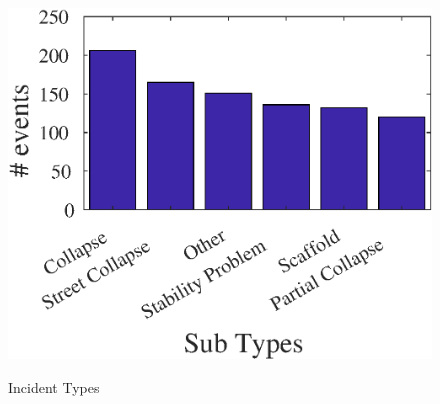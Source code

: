 \begin{figure}[!ht]
{       \includegraphics[scale=0.35]{Figures/Data/SubType/structural}
       \label{2c}}
	\caption{Incident Types}
  \label{fig:subtype} 
  \vspace{-3mm}
\end{figure}
